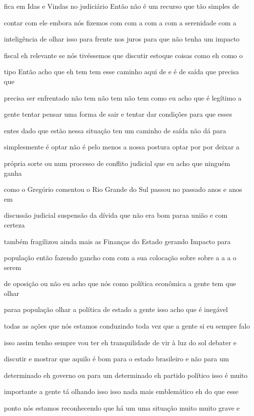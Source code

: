 \documentclass[a4paper,12pt]{article}
\begin{document}
fica em Idas e Vindas no judiciário Então não é um recurso que tão simples de

contar com ele embora nós fizemos com com a com a com a serenidade com a

inteligência de olhar isso para frente nos juros para que não tenha um impacto

fiscal eh relevante se nós tivéssemos que discutir estoque coisas como eh como o

tipo Então acho que eh tem tem esse caminho aqui de e é de saída que precisa que

precisa ser enfrentado não tem não tem não tem como eu acho que é legítimo a

gente tentar pensar uma forma de sair e tentar dar condições para que esses

entes dado que estão nessa situação ten um caminho de saída não dá para

simplesmente é optar não é pelo menos a nossa postura optar por por deixar a

própria sorte ou num processo de conflito judicial que eu acho que ninguém ganha

como o Gregório comentou o Rio Grande do Sul passou no passado anos e anos em

discussão judicial suspensão da dívida que não era bom paraa união e com certeza

também fragilizou ainda mais as Finanças do Estado gerando Impacto para

população então fazendo gancho com com a sua colocação sobre sobre a a a o serem

de oposição ou não eu acho que nós como política econômica a gente tem que olhar

paraa população olhar a política de estado a gente isso acho que é inegável

todas as ações que nós estamos conduzindo toda vez que a gente si eu sempre falo

isso assim tenho sempre vou ter eh tranquilidade de vir à luz do sol debater e

discutir e mostrar que aquilo é bom para o estado brasileiro e não para um

determinado eh governo ou para um determinado eh partido político isso é muito

importante a gente tá olhando isso isso nada mais emblemático eh do que esse

ponto nós estamos reconhecendo que há um uma situação muito muito grave e
\end{document}
